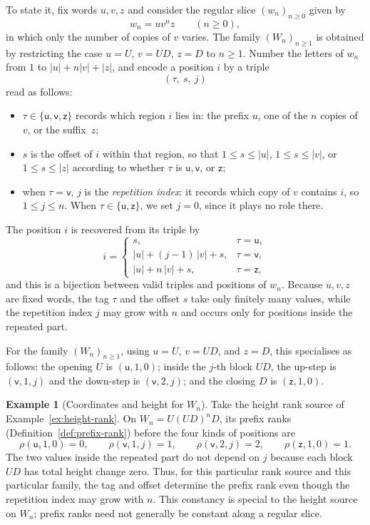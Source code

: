 \documentclass[11pt]{article}
\theoremstyle{definition}
\newtheorem{example}[theorem]{Example}
\begin{document}
To state it, fix words $u,v,z$ and consider the regular slice
$(w_n)_{n\ge0}$ given by
\[
   w_n=uv^nz\qquad(n\ge 0),
\]
in which only the number of copies of $v$ varies.  The family
$(W_n)_{n\ge1}$ is obtained by restricting the case $u=U$, $v=UD$, $z=D$ to
$n\ge1$.  Number the letters of $w_n$
from $1$ to $|u|+n|v|+|z|$, and encode a position $i$ by a triple
\[
   (\tau,\ s,\ j)
\]
read as follows:
\begin{itemize}
\item $\tau\in\{\mathsf u,\mathsf v,\mathsf z\}$ records which region $i$ lies
  in: the prefix $u$, one of the $n$ copies of $v$, or the suffix~$z$;
\item $s$ is the offset of $i$ within that region, so that $1\le s\le|u|$,
  $1\le s\le|v|$, or $1\le s\le|z|$ according to whether $\tau$ is
  $\mathsf u,\mathsf v$, or $\mathsf z$;
\item when $\tau=\mathsf v$, $j$ is the \emph{repetition index}: it records
  which copy of $v$ contains $i$, so $1\le j\le n$.  When
  $\tau\in\{\mathsf u,\mathsf z\}$, we set $j=0$, since it plays no role there.
\end{itemize}
The position $i$ is recovered from its triple by
\[
   i=
   \begin{cases}
     s, & \tau=\mathsf u,\\[2pt]
     |u|+(j-1)\,|v|+s, & \tau=\mathsf v,\\[2pt]
     |u|+n\,|v|+s, & \tau=\mathsf z,
   \end{cases}
\]
and this is a bijection between valid triples and positions of $w_n$.
Because $u,v,z$ are fixed words, the tag $\tau$ and the offset $s$ take only
finitely many values, while the repetition index $j$ may grow with $n$ and
occurs only for positions inside the repeated part.

For the family $(W_n)_{n\ge1}$, using $u=U$, $v=UD$, and $z=D$, this
specialises as follows: the opening $U$ is $(\mathsf u,1,0)$; inside the $j$-th
block $UD$, the up-step is $(\mathsf v,1,j)$ and the down-step is
$(\mathsf v,2,j)$; and the closing $D$ is $(\mathsf z,1,0)$.

\begin{example}[Coordinates and height for $W_n$]
\label{ex:slice-coordinates}
Take the height rank source of Example~\ref{ex:height-rank}.  On
$W_n=U(UD)^nD$, its prefix ranks (Definition~\ref{def:prefix-rank}) before the
four kinds of positions are
\[
   \rho(\mathsf u,1,0)=0,\qquad
   \rho(\mathsf v,1,j)=1,\qquad
   \rho(\mathsf v,2,j)=2,\qquad
   \rho(\mathsf z,1,0)=1.
\]
The two values inside the repeated part do not depend on $j$ because each
block $UD$ has total height change zero.  Thus, for this particular rank source
and this particular family, the tag and offset determine the prefix rank even
though the repetition index may grow with $n$.  This constancy is special to
the height source on $W_n$; prefix ranks need not generally be constant along
a regular slice.
\end{example}
\end{document}
